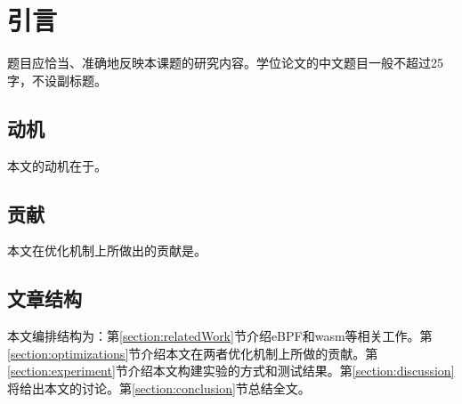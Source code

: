 
\section{引言}
题目应恰当、准确地反映本课题的研究内容。学位论文的中文题目一般不超过25字，不设副标题。
\subsection{动机}
本文的动机在于。
\subsection{贡献}
本文在优化机制上所做出的贡献是。
\subsection{文章结构}
本文编排结构为：第\ref{section:relatedWork}节介绍eBPF和wasm等相关工作。第\ref{section:optimizations}节介绍本文在两者优化机制上所做的贡献。第\ref{section:experiment}节介绍本文构建实验的方式和测试结果。第\ref{section:discussion}将给出本文的讨论。第\ref{section:conclusion}节总结全文。
